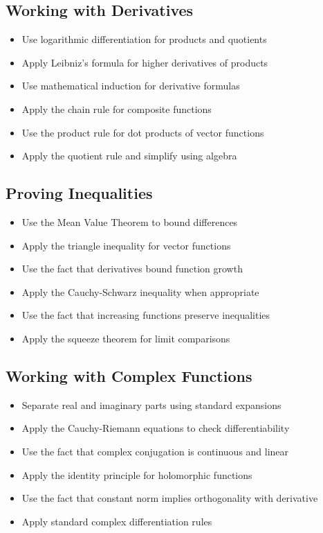 \subsection*{Working with Derivatives}
\begin{itemize}
\item Use logarithmic differentiation for products and quotients
\item Apply Leibniz's formula for higher derivatives of products
\item Use mathematical induction for derivative formulas
\item Apply the chain rule for composite functions
\item Use the product rule for dot products of vector functions
\item Apply the quotient rule and simplify using algebra
\end{itemize}

\subsection*{Proving Inequalities}
\begin{itemize}
\item Use the Mean Value Theorem to bound differences
\item Apply the triangle inequality for vector functions
\item Use the fact that derivatives bound function growth
\item Apply the Cauchy-Schwarz inequality when appropriate
\item Use the fact that increasing functions preserve inequalities
\item Apply the squeeze theorem for limit comparisons
\end{itemize}

\subsection*{Working with Complex Functions}
\begin{itemize}
\item Separate real and imaginary parts using standard expansions
\item Apply the Cauchy-Riemann equations to check differentiability
\item Use the fact that complex conjugation is continuous and linear
\item Apply the identity principle for holomorphic functions
\item Use the fact that constant norm implies orthogonality with derivative
\item Apply standard complex differentiation rules
\end{itemize}

